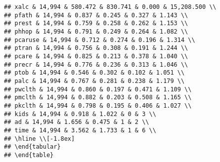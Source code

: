 \documentclass[]{article}
\begin{document}
\begin{verbatim}
## xalc & 14,994 & 580.472 & 830.741 & 0.000 & 15,208.500 \\ 
## pfath & 14,994 & 0.837 & 0.245 & 0.327 & 1.143 \\ 
## prest & 14,994 & 0.759 & 0.258 & 0.262 & 1.153 \\ 
## phhop & 14,994 & 0.791 & 0.249 & 0.264 & 1.082 \\ 
## pcaruse & 14,994 & 0.712 & 0.274 & 0.196 & 1.314 \\ 
## ptran & 14,994 & 0.756 & 0.308 & 0.191 & 1.244 \\ 
## pcare & 14,994 & 0.825 & 0.213 & 0.378 & 1.040 \\ 
## precr & 14,994 & 0.776 & 0.236 & 0.313 & 1.046 \\ 
## ptob & 14,994 & 0.546 & 0.302 & 0.102 & 1.051 \\ 
## palc & 14,994 & 0.767 & 0.281 & 0.238 & 1.179 \\ 
## pwclth & 14,994 & 0.860 & 0.197 & 0.471 & 1.109 \\ 
## pmclth & 14,994 & 0.882 & 0.203 & 0.508 & 1.165 \\ 
## pkclth & 14,994 & 0.798 & 0.195 & 0.406 & 1.027 \\ 
## kids & 14,994 & 0.918 & 1.022 & 0 & 3 \\ 
## ad & 14,994 & 1.656 & 0.475 & 1 & 2 \\ 
## time & 14,994 & 3.562 & 1.733 & 1 & 6 \\ 
## \hline \\[-1.8ex] 
## \end{tabular} 
## \end{table}
\end{verbatim}
\end{document}
